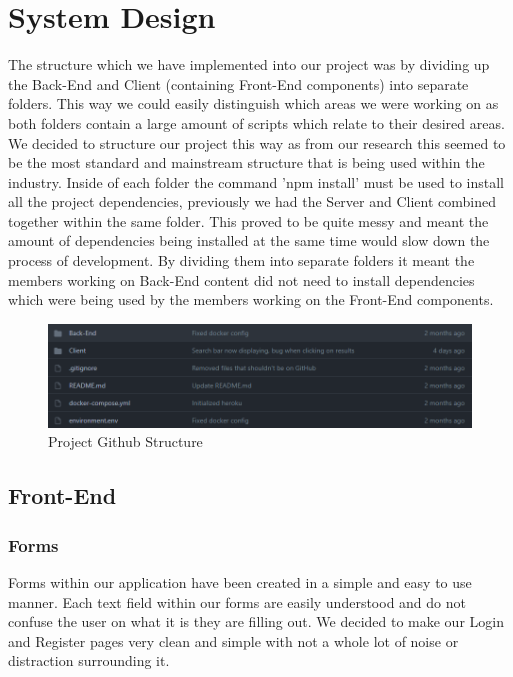 \chapter{System Design}

The structure which we have implemented into our project was by dividing up the Back-End and Client (containing Front-End components) into separate folders. This way we could easily distinguish which areas we were working on as both folders contain a large amount of scripts which relate to their desired areas. We decided to structure our project this way as from our research this seemed to be the most standard and mainstream structure that is being used within the industry. Inside of each folder the command 'npm install' must be used to install all the project dependencies, previously we had the Server and Client combined together within the same folder. This proved to be quite messy and meant the amount of dependencies being installed at the same time would slow down the process of development. By dividing them into separate folders it meant the members working on Back-End content did not need to install dependencies which were being used by the members working on the Front-End components.

\begin{figure}[H]
  \centering
  \includegraphics[scale=0.65]{img/structure.PNG}
  \caption{Project Github Structure}
  \label{fig:Project Github Structure}
\end{figure}


\section{Front-End}

\subsection{Forms}
Forms within our application have been created in a simple and easy to use manner. Each text field within our forms are easily understood and do not confuse the user on what it is they are filling out. We decided to make our Login and Register pages very clean and simple with not a whole lot of noise or distraction surrounding it. 

